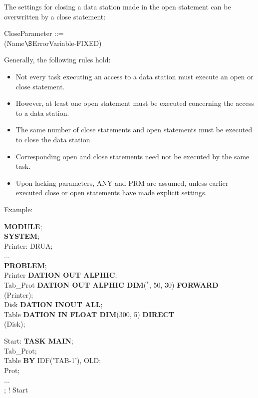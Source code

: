 The settings for closing a data station made in the open statement can
be overwritten by a close statement:

CloseParameter ::=\\
 (Name$\S $ErrorVariable-FIXED)

Generally, the following rules hold:
\begin{itemize}
\item Not every task executing an access to a data station must execute
an open or close statement.
\item However, at least one open statement must be executed concerning
the access to a data station.
\item The same number of close statements and open statements must
be executed to close the data station.
\item Corresponding open and close statements need not be executed by
the same task.
\item Upon lacking parameters, ANY and PRM are assumed, unless earlier
executed close or open statements have made explicit settings.
\end{itemize}

Example:

{\bf MODULE};\\
{\bf SYSTEM};\\
\x Printer: DRUA;\\
\x ... \\
{\bf PROBLEM};\\
 Printer {\bf DATION OUT  ALPHIC};\\
 Tab\_Prot {\bf DATION OUT ALPHIC DIM}($^*$, 50, 30) {\bf FORWARD}\\
\x {}(Printer);\\
 Disk {\bf DATION INOUT  ALL};\\
 Table {\bf DATION IN FLOAT DIM}(300, 5) {\bf DIRECT}\\
\x {}(Disk);

Start: {\bf TASK MAIN};\\
 Tab\_Prot;\\
 Table {\bf BY} IDF('TAB-1'), OLD;\\
 Prot;\\
\x ...\\
; ! Start

